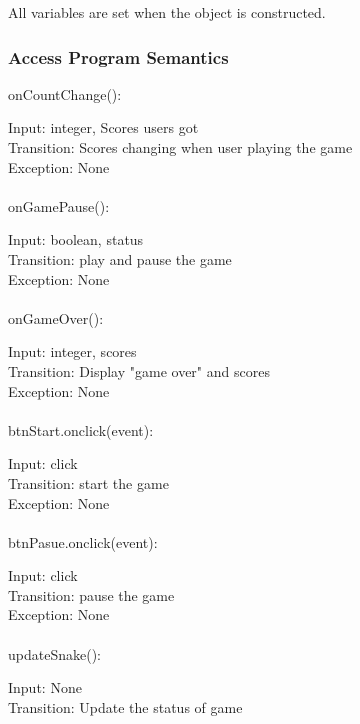 \documentclass[12pt, titlepage]{article}
\begin{document}
		All variables are set when the object is constructed.

		\subsubsection{Access Program Semantics}

	  onCountChange():
		
		Input: integer, Scores users got\\
		
		Transition: Scores changing when user playing the game\\
		
		Exception: None\\
		\\
	  onGamePause():
		
		Input: boolean, status\\
		
		Transition: play and pause the game\\
		
		Exception: None\\
		\\
	onGameOver():
		
		Input: integer, scores\\
		
		Transition: Display "game over" and scores\\
		
		Exception: None\\
		\\
		btnStart.onclick(event):
		
		Input: click\\
		
		Transition: start the game\\
		
		Exception: None\\
		\\
		btnPasue.onclick(event):
		
		Input: click\\
		
		Transition: pause the game\\
		
		Exception: None\\
		\\
		updateSnake():
		
		Input: None\\
		
		Transition: Update the status of game\\
		
\end{document}
